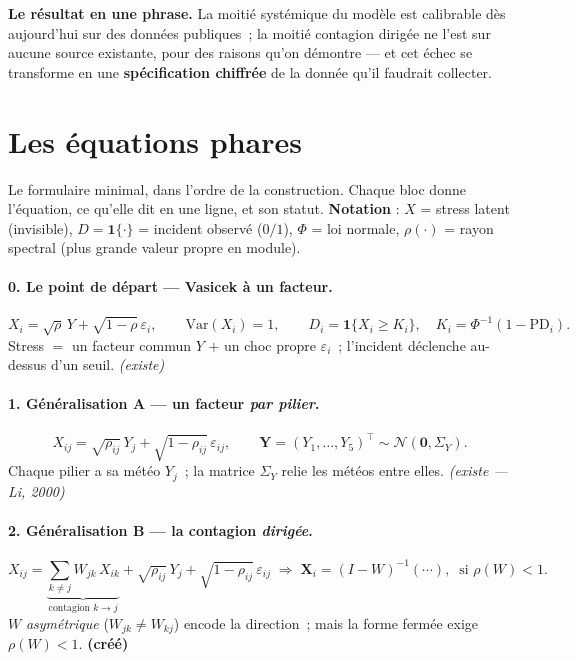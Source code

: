 \documentclass[11pt,a4paper]{article}
\newcommand{\Y}{Y}
\newcommand{\eps}{\varepsilon}
\begin{document}
\begin{cle}
\textbf{Le résultat en une phrase.} La moitié \og{}systémique\fg{} du modèle est calibrable dès
aujourd'hui sur des données publiques~; la moitié \og{}contagion dirigée\fg{} ne l'est sur aucune
source existante, pour des raisons qu'on démontre --- et cet échec se transforme en une
\textbf{spécification chiffrée} de la donnée qu'il faudrait collecter.
\end{cle}

\section{Les équations phares}
\label{sec:formulaire}

Le formulaire minimal, dans l'ordre de la construction. Chaque bloc donne l'équation, ce
qu'elle dit en une ligne, et son statut. \textbf{Notation} : $X$ = stress latent (invisible),
$D=\mathbf 1\{\cdot\}$ = incident observé ($0/1$), $\Phi$ = loi normale, $\rho(\cdot)$ = rayon
spectral (plus grande valeur propre en module).

\paragraph{0. Le point de départ --- Vasicek à un facteur.}
\begin{equation}
X_i = \sqrt{\rho}\,\Y + \sqrt{1-\rho}\,\eps_i, \qquad \mathrm{Var}(X_i)=1, \qquad
D_i = \mathbf 1\{X_i \ge K_i\}, \quad K_i = \Phi^{-1}(1-\mathrm{PD}_i).
\end{equation}
Stress $=$ un facteur commun $\Y$ $+$ un choc propre $\eps_i$~; l'incident déclenche au-dessus
d'un seuil. \emph{(existe)}

\paragraph{1. Généralisation A --- un facteur \emph{par pilier}.}
\begin{equation}
X_{ij} = \sqrt{\rho_{ij}}\,\Y_j + \sqrt{1-\rho_{ij}}\,\eps_{ij}, \qquad
\mathbf Y = (\Y_1,\dots,\Y_5)^\top \sim \mathcal N(\mathbf 0, \Sigma_Y).
\end{equation}
Chaque pilier a sa \og{}météo\fg{} $\Y_j$~; la matrice $\Sigma_Y$ relie les météos entre elles.
\emph{(existe --- Li, 2000)}

\paragraph{2. Généralisation B --- la contagion \emph{dirigée}.}
\begin{equation}
X_{ij} = \underbrace{\sum_{k\neq j} W_{jk}\,X_{ik}}_{\text{contagion } k\to j}
 + \sqrt{\rho_{ij}}\,\Y_j + \sqrt{1-\rho_{ij}}\,\eps_{ij}
 \;\Longrightarrow\; \mathbf X_i = (I-W)^{-1}(\cdots), \;\; \text{si } \rho(W)<1.
\end{equation}
$W$ \emph{asymétrique} ($W_{jk}\neq W_{kj}$) encode la direction~; mais la forme fermée exige
$\rho(W)<1$. \textbf{(créé)}
\end{document}

